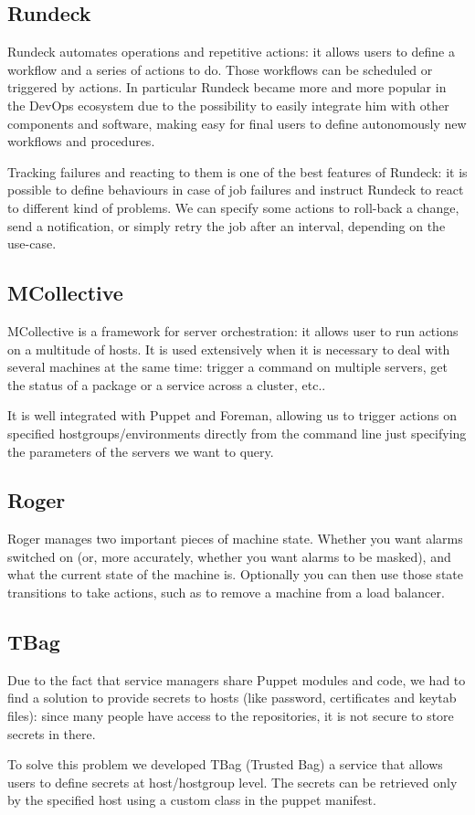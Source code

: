\subsection{Rundeck}

Rundeck automates operations and repetitive actions: it allows users to
define a workflow and a series of actions to do. Those workflows can be
scheduled or triggered by actions. In particular Rundeck became more and
more popular in the DevOps ecosystem due to the possibility to easily
integrate him with other components and software, making easy for final
users to define autonomously new workflows and procedures.

Tracking failures and reacting to them is one of the best features of
Rundeck: it is possible to define behaviours in case of job failures and
instruct Rundeck to react to different kind of problems. We can specify
some actions to roll-back a change, send a notification, or simply retry
the job after an interval, depending on the use-case. 

\subsection{MCollective}

MCollective is a framework for server orchestration: it allows user to run
actions on a multitude of hosts. It is used extensively when it is
necessary to deal with several machines at the same time: trigger
a command on multiple servers, get the status of a package or a service
across a cluster, etc..

It is well integrated with Puppet and Foreman, allowing us to trigger
actions on specified hostgroups/environments directly from the command
line just specifying the parameters of the servers we want to query.

\subsection{Roger}

Roger manages two important pieces of machine state. Whether you want
alarms switched on (or, more accurately, whether you want alarms to be
masked), and what the current state of the machine is. Optionally you can
then use those state transitions to take actions, such as to remove
a machine from a load balancer.

\subsection{TBag}

Due to the fact that service managers share Puppet modules and code, we
had to find a solution to provide secrets to hosts (like password,
certificates and keytab files): since many people have access to the
repositories, it is not secure to store secrets in there.

To solve this problem we developed TBag (Trusted Bag) a service that
allows users to define secrets at host/hostgroup level. The secrets can be
retrieved only by the specified host using a custom class in the puppet
manifest. 

